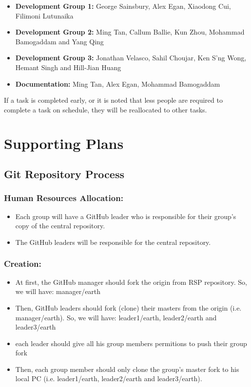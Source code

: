 \documentclass{article}
\begin{document}
\begin{itemize}
	
\item \textbf{Development Group 1:} George Sainsbury, Alex Egan, Xiaodong Cui, Filimoni Lutunaika \\

\item \textbf{Development Group 2:} Ming Tan, Callum Ballie, Kun Zhou, Mohammad Bamogaddam and Yang Qing\\

\item \textbf{Development Group 3:} Jonathan Velasco, Sahil Choujar, Ken S'ng Wong, Hemant Singh and Hill-Jian Huang\\

\item \textbf{Documentation:} Ming Tan, Alex Egan, Mohammad Bamogaddam\\

\end{itemize}

If a task is completed early, or it is noted that less people are required to complete a task on schedule, they will be reallocated to other tasks.\\

\section{Supporting Plans}

\subsection{Git Repository Process}

\subsubsection{Human Resources Allocation:}
\begin{itemize}	
\item Each group will have a GitHub leader who is responsible for their group's copy of the central repository.
\item The GitHub leaders will be responsible for the central repository.
\end{itemize}

\subsubsection{Creation:}
\begin{itemize}	
\item At first, the GitHub manager should fork the origin from RSP repository. So, we will have: manager/earth
\item Then, GitHub leaders should fork (clone) their masters from the origin (i.e. manager/earth). So, we will have: leader1/earth, leader2/earth and leader3/earth
\item each leader should give all his group members permitions to push their group fork
\item Then, each group member should only clone the group's master fork to his local PC (i.e. leader1/earth, leader2/earth and leader3/earth).
\end{itemize}
\end{document}
